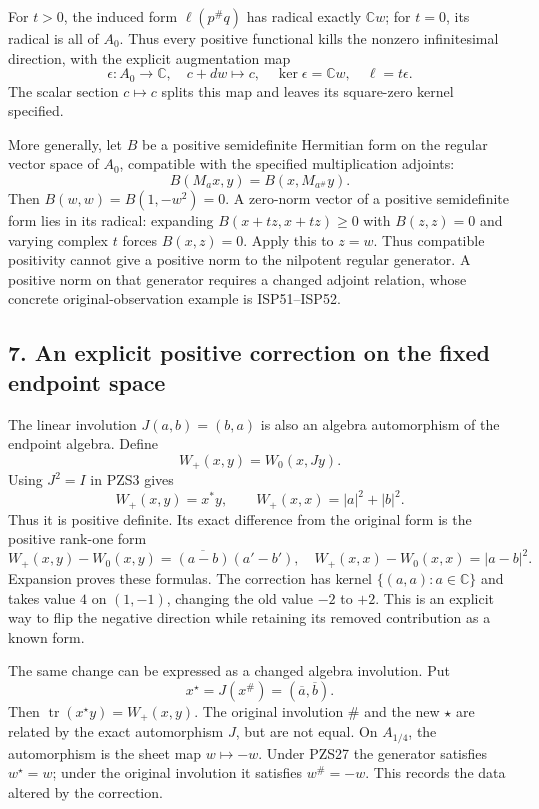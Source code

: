 \documentclass[
  10pt,
  a4paper,
]{article}
\begin{document}
For \(t>0\), the induced form \(\ell(p^\#q)\) has radical exactly
\(\mathbb Cw\); for \(t=0\), its radical is all of \(A_0\). Thus every
positive functional kills the nonzero infinitesimal direction, with the
explicit augmentation map \[
\epsilon:A_0\to\mathbb C,\quad c+dw\mapsto c,
\quad\ker\epsilon=\mathbb Cw,
\quad\ell=t\epsilon.
\tag{PZS22}
\] The scalar section \(c\mapsto c\) splits this map and leaves its
square-zero kernel specified.

More generally, let \(B\) be a positive semidefinite Hermitian form on
the regular vector space of \(A_0\), compatible with the specified
multiplication adjoints: \[
B(M_a x,y)=B(x,M_{a^\#}y).
\tag{PZS23}
\] Then \(B(w,w)=B(1,-w^2)=0\). A zero-norm vector of a positive
semidefinite form lies in its radical: expanding \(B(x+tz,x+tz)\ge0\)
with \(B(z,z)=0\) and varying complex \(t\) forces \(B(x,z)=0\). Apply
this to \(z=w\). Thus compatible positivity cannot give a positive norm
to the nilpotent regular generator. A positive norm on that generator
requires a changed adjoint relation, whose concrete original-observation
example is ISP51--ISP52.

\subsection{7. An explicit positive correction on the fixed endpoint
space}\label{an-explicit-positive-correction-on-the-fixed-endpoint-space}

The linear involution \(J(a,b)=(b,a)\) is also an algebra automorphism
of the endpoint algebra. Define \[
W_+(x,y)=W_0(x,Jy).
\tag{PZS24}
\] Using \(J^2=I\) in PZS3 gives \[
W_+(x,y)=x^*y,
\qquad W_+(x,x)=|a|^2+|b|^2.
\tag{PZS25}
\] Thus it is positive definite. Its exact difference from the original
form is the positive rank-one form \[
W_+(x,y)-W_0(x,y)
=\overline{(a-b)}(a'-b'),
\quad W_+(x,x)-W_0(x,x)=|a-b|^2.
\tag{PZS26}
\] Expansion proves these formulas. The correction has kernel
\(\{(a,a):a\in\mathbb C\}\) and takes value \(4\) on \((1,-1)\),
changing the old value \(-2\) to \(+2\). This is an explicit way to flip
the negative direction while retaining its removed contribution as a
known form.

The same change can be expressed as a changed algebra involution. Put \[
x^\star=J(x^\#)=(\overline a,\overline b).
\tag{PZS27}
\] Then \(\operatorname{tr}(x^\star y)=W_+(x,y)\). The original
involution \(\#\) and the new \(\star\) are related by the exact
automorphism \(J\), but are not equal. On \(A_{1/4}\), the automorphism
is the sheet map \(w\mapsto-w\). Under PZS27 the generator satisfies
\(w^\star=w\); under the original involution it satisfies \(w^\#=-w\).
This records the data altered by the correction.
\end{document}
